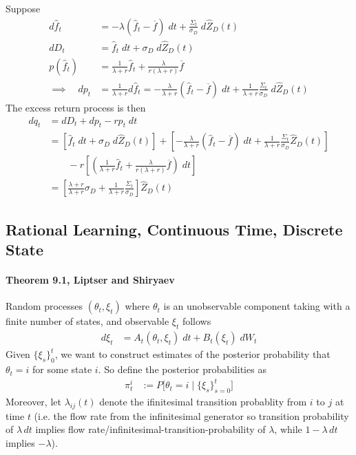 \documentclass[12pt]{article}
\theoremstyle{plain}
\theoremstyle{definition}
\theoremstyle{remark}
\begin{document}
\clearpage
Suppose
\begin{align*}
  d\hat{f}_t
  &=
  -\lambda(
  \hat{f}_t-\overline{f}
  )\;dt
  +
  \frac{\Sigma_t}{\sigma_D}
  \;d\hat{Z}_D(t)
  \\
  dD_t
  &=
  \hat{f}_t\;dt+\sigma_D\;d\hat{Z}_D(t)
  \\
  p(\hat{f}_t)
  &=
  \frac{1}{\lambda+r}\hat{f}_t
  +
  \frac{\lambda}{r(\lambda+r)}
  \overline{f}
  \\
  \implies\quad
  dp_t
  &=
  \frac{1}{\lambda+r}
  d\hat{f}_t
  =
  -\frac{\lambda}{\lambda+r}
  (
  \hat{f}_t-\overline{f}
  )\;dt
  +
  \frac{1}{\lambda+r}
  \frac{\Sigma_t}{\sigma_D}
  \;d\hat{Z}_D(t)
\end{align*}
The excess return process is then
\begin{align*}
  dq_t
  &=
  dD_t
  +
  dp_t
  - rp_t\;dt
  \\
  &=
  \left[
  \hat{f}_t\;dt+\sigma_D\;d\hat{Z}_D(t)
  \right]
  +
  \left[
  -\frac{\lambda}{\lambda+r}
  (
  \hat{f}_t-\overline{f}
  )\;dt
  +
  \frac{1}{\lambda+r}
  \frac{\Sigma_t}{\sigma_D}
  \hat{Z}_D(t)
  \right]
  \\
  &\qquad
  -
  r
  \left[
  \left(
  \frac{1}{\lambda+r}\hat{f}_t
  +
  \frac{\lambda}{r(\lambda+r)}
  \overline{f}
  \right)
  \;dt
  \right]
  \\
  &=
  \left[
  \frac{\lambda+r}{\lambda+r}
  \sigma_D +
  \frac{1}{\lambda+r}
  \frac{\Sigma_t}{\sigma_D}
  \right]
  \hat{Z}_D(t)
\end{align*}



\clearpage
\subsection{Rational Learning, Continuous Time, Discrete State}

\paragraph{Theorem 9.1, Liptser and Shiryaev}
Random processes $(\theta_t,\xi_t)$ where $\theta_t$ is an unobservable
component taking with a finite number of states, and observable $\xi_t$
follows
\begin{align*}
  d\xi_t
  &= A_t(\theta_t,\xi_t)\;dt + B_t(\xi_t)\;dW_t
\end{align*}
Given $\{\xi_s\}_{0}^t$, we want to construct estimates of the posterior
probability that $\theta_t=i$ for some state $i$. So define the
posterior probabilities as
\begin{align*}
  \pi^i_t
  &:= P\big[\theta_t=i\;|\;\{\xi_s\}_{s=0}^t\big]
\end{align*}
Moreover, let $\lambda_{ij}(t)$ denote the ifinitesimal transition
probablity from $i$ to $j$ at time $t$ (i.e. the flow rate from the
infinitesimal generator so transition probability of $\lambda\,dt$
implies flow rate/infinitesimal-transition-probability of $\lambda$,
while $1-\lambda\,dt$ implies $-\lambda$).
\end{document}
